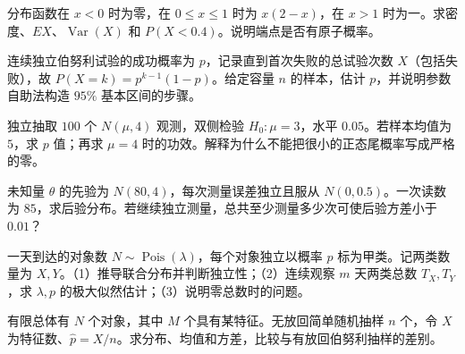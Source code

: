 \begin{exercise}[从分布函数回到密度与期望]\label{q:M-PF-21}
分布函数在 $x<0$ 时为零，在 $0\le x\le1$ 时为 $x(2-x)$，在 $x>1$ 时为一。求密度、$EX$、$\operatorname{Var}(X)$ 和 $P(X<0.4)$。说明端点是否有原子概率。\par{}\end{exercise}

\begin{exercise}[参数自助法与基本区间]\label{q:M-PF-29}
连续独立伯努利试验的成功概率为 $p$，记录直到首次失败的总试验次数 $X$（包括失败），故 $P(X=k)=p^{k-1}(1-p)$。给定容量 $n$ 的样本，估计 $p$，并说明参数自助法构造 $95\%$ 基本区间的步骤。\par{}\end{exercise}

\begin{exercise}[极小尾概率与数值稳定性]\label{q:M-PF-30}
独立抽取 $100$ 个 $N(\mu,4)$ 观测，双侧检验 $H_0:\mu=3$，水平 $0.05$。若样本均值为 $5$，求 $p$ 值；再求 $\mu=4$ 时的功效。解释为什么不能把很小的正态尾概率写成严格的零。\par{}\end{exercise}

\begin{exercise}[正态测量的后验精度规划]\label{q:M-PF-31}
未知量 $\theta$ 的先验为 $N(80,4)$，每次测量误差独立且服从 $N(0,0.5)$。一次读数为 $85$，求后验分布。若继续独立测量，总共至少测量多少次可使后验方差小于 $0.01$？\par{}\end{exercise}

\begin{exercise}[泊松分裂与参数推断]\label{q:B17.1}
一天到达的对象数 $N\sim\operatorname{Pois}(\lambda)$，每个对象独立以概率 $p$ 标为甲类。记两类数量为 $X,Y$。（1）推导联合分布并判断独立性；（2）连续观察 $m$ 天两类总数 $T_X,T_Y$，求 $\lambda,p$ 的极大似然估计；（3）说明零总数时的问题。\par{}\end{exercise}

\begin{exercise}[有限总体抽样与修正因子]\label{q:B17.2}
有限总体有 $N$ 个对象，其中 $M$ 个具有某特征。无放回简单随机抽样 $n$ 个，令 $X$ 为特征数、$\widehat p=X/n$。求分布、均值和方差，比较与有放回伯努利抽样的差别。\par{}\end{exercise}

